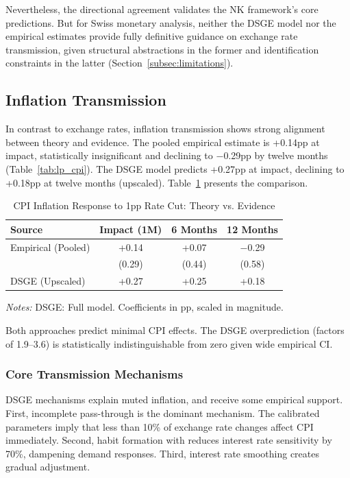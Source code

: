 \documentclass[12pt,a4paper]{article}
\begin{document}
Nevertheless, the directional agreement validates the NK framework's core predictions. But for Swiss monetary analysis, neither the DSGE model nor the empirical estimates provide fully definitive guidance on exchange rate transmission, given structural abstractions in the former and identification constraints in the latter (Section~\ref{subsec:limitations}).

\subsection{Inflation Transmission}
\label{subsec:inflation_discussion}
In contrast to exchange rates, inflation transmission shows strong alignment between theory and evidence. The pooled empirical estimate is +0.14pp at impact, statistically insignificant and declining to $-$0.29pp by twelve months (Table~\ref{tab:lp_cpi}). The DSGE model predicts +0.27pp at impact, declining to +0.18pp at twelve months (upscaled). Table~\ref{tab:cpi_comparison} presents the comparison.

\begin{table}[H]
	\centering
	\caption{CPI Inflation Response to 1pp Rate Cut: Theory vs. Evidence}
	\label{tab:cpi_comparison}
	\small
	\begin{threeparttable}
		\begin{tabular}{@{}lccc@{}}
			\toprule
			\textbf{Source} & \textbf{Impact (1M)} & \textbf{6 Months} & \textbf{12 Months} \\
			\midrule
			Empirical (Pooled) & +0.14 & +0.07 & $-$0.29 \\
			& (0.29) & (0.44) & (0.58) \\
			\midrule
			DSGE (Upscaled) & +0.27 & +0.25 & +0.18 \\	
			\bottomrule
		\end{tabular}
		\begin{tablenotes}
			\footnotesize
			\item \textit{Notes:} DSGE: Full model. Coefficients in pp, scaled in magnitude.
		\end{tablenotes}
	\end{threeparttable}
\end{table}
Both approaches predict minimal CPI effects. The DSGE overprediction (factors of 1.9–3.6) is statistically indistinguishable from zero given wide empirical CI.

\subsubsection{Core Transmission Mechanisms}
DSGE mechanisms explain muted inflation, and receive some empirical support. First, incomplete pass-through is the dominant mechanism. The calibrated 
parameters imply that less than 10\% of exchange rate changes affect CPI 
immediately. Second, habit formation with reduces interest rate sensitivity by 70\%, dampening demand responses. Third, interest rate smoothing creates gradual adjustment.
\end{document}
